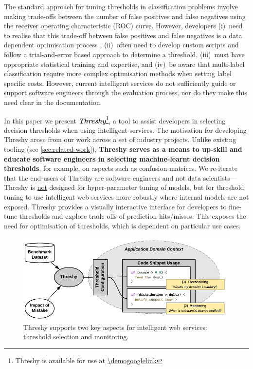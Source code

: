 The standard approach for tuning thresholds in classification problems involve making trade-offs between the number of false positives and false negatives using the receiver operating characteristic (ROC) curve. However, developers (i)~need to realise that this trade-off between false positives and false negatives is a data dependent optimisation process \citep{sculley2011detecting}, (ii)~often need to develop custom scripts and follow a trial-and-error based approach to determine a threshold, (iii)~must have appropriate statistical training and expertise, and (iv)~be aware that multi-label classification require more complex optimisation methods when setting label specific costs. However, current intelligent services do not sufficiently guide or support software engineers through the evaluation process, nor do they make this need clear in the documentation. 

In this paper we present \textit{\bfseries Threshy}\footnote{Threshy is available for use at \url{\demogooglelink}}, a tool to assist developers in selecting decision thresholds when using intelligent services. The motivation for developing Threshy arose from our work across a set of industry projects. Unlike existing tooling (see \cref{sec:related-work}), \textbf{Threshy serves as a means to up-skill and educate software engineers in selecting machine-learnt decision thresholds}, for example, on aspects such as confusion matrices. We re-iterate that the end-users of Threshy are software engineers and not data scientists---Threshy is \uline{not} designed for hyper-parameter tuning of models, but for threshold tuning to use intelligent web services more robustly where internal models are not exposed.%
Threshy provides a visually interactive interface for developers to fine-tune thresholds and explore trade-offs of prediction hits/misses. This exposes the need for optimisation of thresholds, which is dependent on particular use cases.

\begin{figure}
    \centering
    \includegraphics[width=.9\linewidth]{usage-thresholding-monitoring.pdf}
    \caption{Threshy supports two key aspects for intelligent web services: threshold selection and monitoring.}
    \label{fig:usage-thresholding-monitoring}
\end{figure}

